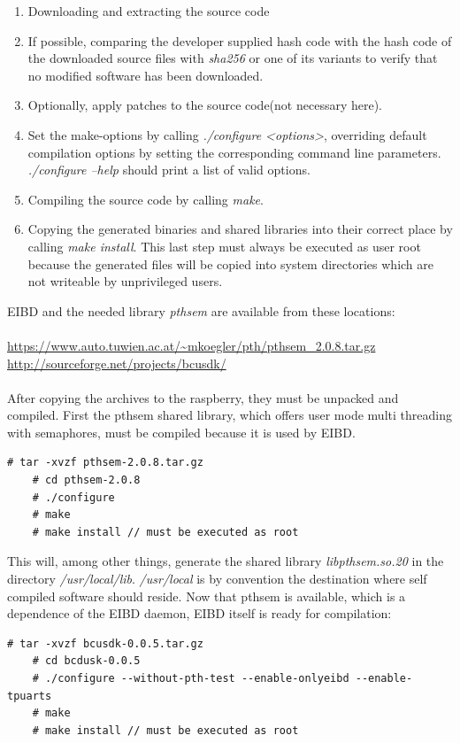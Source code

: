 \begin{enumerate}
 \item Downloading and extracting the source code
 \item If possible, comparing the developer supplied hash code  with the hash code of the downloaded source files with
 \textit{sha256} or one of its variants to verify that no modified software has been downloaded.
 \item Optionally, apply patches to the source code(not necessary here).
 \item Set the make-options by calling \textit{./configure <options>}, overriding default compilation options by setting the corresponding command line parameters.
 \textit{./configure --help} should print a list of valid options.
 \item Compiling the source code by calling \textit{make}.
 \item Copying the generated binaries and shared libraries into their correct place by calling \textit{make install}. This last step must always be executed
 as user root because the generated files will be copied into system directories which are not writeable by unprivileged users.
\end{enumerate}
EIBD and the needed library \textit{pthsem} are available from these locations:
\\
\\
\url{https://www.auto.tuwien.ac.at/~mkoegler/pth/pthsem_2.0.8.tar.gz}\\
\url{http://sourceforge.net/projects/bcusdk/}
\\
\\
After copying the archives to the raspberry, they must be unpacked and compiled. First the pthsem shared library, which offers user mode multi
threading with semaphores, must be compiled because it is used by EIBD. 
\begin{lstlisting}[style=BashInputStyle]
    # tar -xvzf pthsem-2.0.8.tar.gz
    # cd pthsem-2.0.8
    # ./configure
    # make
    # make install // must be executed as root
\end{lstlisting}
This will, among other things, generate the shared library \textit{libpthsem.so.20} in the directory \textit{/usr/local/lib}. \textit{/usr/local}
 is by convention the destination where self compiled software should reside.
Now that pthsem is available, which is a dependence of the EIBD daemon, EIBD itself is ready for compilation:

\begin{lstlisting}[style=BashInputStyle]
    # tar -xvzf bcusdk-0.0.5.tar.gz
    # cd bcdusk-0.0.5
    # ./configure --without-pth-test --enable-onlyeibd --enable-tpuarts
    # make
    # make install // must be executed as root
\end{lstlisting}

